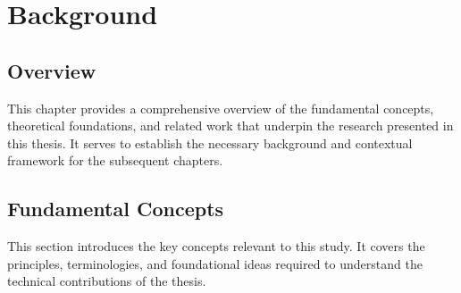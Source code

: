 \chapter{Background}
\label{chapter2}

\section{Overview}

\begin{paragraph}
This chapter provides a comprehensive overview of the fundamental concepts, theoretical foundations, and related work that underpin the research presented in this thesis. It serves to establish the necessary background and contextual framework for the subsequent chapters.
\end{paragraph}

\section{Fundamental Concepts}

\begin{paragraph}
This section introduces the key concepts relevant to this study. It covers the principles, terminologies, and foundational ideas required to understand the technical contributions of the thesis.
\end{paragraph}
